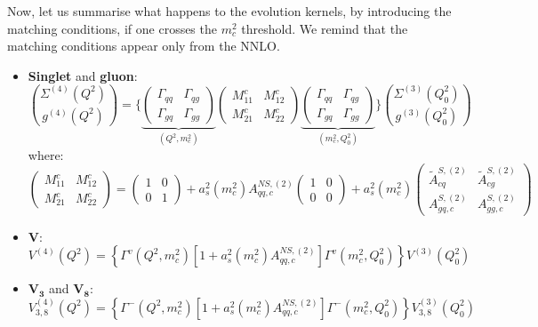 \documentclass[10pt,a4paper]{article}
\begin{document}
Now, let us summarise what happens to the evolution kernels, by
introducing the matching conditions, if one crosses the $m_c^2$
threshold. We remind that the matching conditions appear only from the
NNLO.
\begin{itemize}
\item \textbf{Singlet} and \textbf{gluon}:
\begin{equation}
{\Sigma^{(4)}(Q^2) \choose g^{(4)}(Q^2)} = \Bigg\{\underbrace{\begin{pmatrix} \Gamma_{qq} & \Gamma_{qg} \\ \Gamma_{gq}& \Gamma_{gg}\end{pmatrix}}_{(Q^2,m_c^2)}\begin{pmatrix} M_{11}^c & M_{12}^c \\ M_{21}^c & M_{22}^c\end{pmatrix}\underbrace{\begin{pmatrix} \Gamma_{qq}& \Gamma_{qg} \\ \Gamma_{gq}& \Gamma_{gg}\end{pmatrix}}_{(m_c^2,Q_0^2)}\Bigg\}{\Sigma^{(3)}(Q_0^2) \choose g^{(3)}(Q_0^2)}
\end{equation}
where:
\begin{equation}
\begin{pmatrix} M_{11}^c & M_{12}^c \\ M_{21}^c & M_{22}^c\end{pmatrix}=\begin{pmatrix} 1 & 0 \\ 0 & 1\end{pmatrix}+a_s^2(m_c^2)A_{qq,c}^{N\!S,(2)}\begin{pmatrix} 1 & 0 \\ 0 & 0\end{pmatrix}+a_s^2(m_c^2)\begin{pmatrix} \tilde{A}^{S,(2)}_{cq} & \tilde{A}^{S,(2)}_{cg} \\A^{S,(2)}_{gq,c} & A_{gg,c}^{S,(2)}\end{pmatrix}
\end{equation}
\item $\mathbf{V}$:
\begin{equation}
V^{(4)}(Q^2)=\left\{\Gamma^{v}(Q^2,m_c^2)[1+a_s^2(m_c^2)A_{qq,c}^{N\!S,(2)}]\Gamma^{v}(m_c^2,Q_0^2)\right\}V^{(3)}(Q^2_0)
\end{equation}
\item $\mathbf{V_3}$ and $\mathbf{V_8}$:
\begin{equation}
V^{(4)}_{3,8}(Q^2)=\left\{\Gamma^{-}(Q^2,m_c^2)[1+a_s^2(m_c^2)A_{qq,c}^{N\!S,(2)}]\Gamma^{-}(m_c^2,Q_0^2)\right\}V^{(3)}_{3,8}(Q^2_0)

\end{equation}
\end{itemize}
\end{document}
